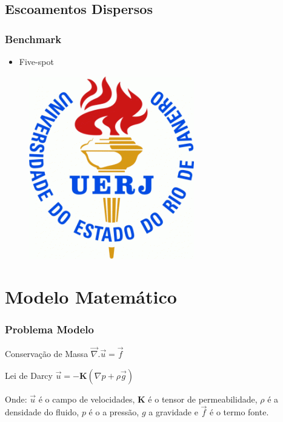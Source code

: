 \documentclass{beamer}
\begin{document}
\subsection{Escoamentos Dispersos}
\begin{frame}
\frametitle{Benchmark}
\begin{itemize}
 \item Five-spot
\end{itemize}
\begin{figure}
\includegraphics[height=0.550\linewidth]{figure/UERJ.png}
\end{figure}
\end{frame}

\section{Modelo Matemático}
\begin{frame}
 \frametitle{Problema Modelo}
\begin{block}{Conservação de Massa}
\centering
$\vec{\nabla}.\vec{u}=\vec{f}$
\end{block}

\begin{block}{Lei de Darcy}
\centering
$\vec{u} = -\mathbf{K} (\nabla p+\rho \vec{g})$
\end{block}

 Onde: $\vec{u}$ é o campo de velocidades, $\mathbf{K}$ é o tensor de permeabilidade, $\rho$ é a densidade do fluido, 
 $p$ é o a pressão, $g$ a gravidade e $\vec{f}$ é o termo fonte.
\end{frame}
\end{document}
